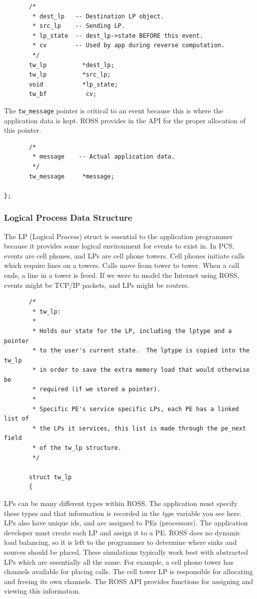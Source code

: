 \documentclass[12pt]{article}
\begin{document}
\begin{verbatim}
       /*
        * dest_lp   -- Destination LP object.
        * src_lp    -- Sending LP.
        * lp_state  -- dest_lp->state BEFORE this event.
        * cv        -- Used by app during reverse computation.
        */
       tw_lp          *dest_lp;
       tw_lp          *src_lp;
       void           *lp_state;
       tw_bf           cv;
\end{verbatim}
 
The {\tt tw\_message} pointer is critical to an event because this is where
the application data is kept.  ROSS provides in the API for the proper
allocation of this pointer.

\begin{verbatim}
       /*
        * message    -- Actual application data.
        */
       tw_message     *message;

};
\end{verbatim}

\subsubsection{Logical Process Data Structure}
The LP (Logical Process) struct is essential to the application
programmer because it provides some logical environment for events to
exist in.  In PCS, events are cell phones, and LPs are cell phone
towers.  Cell phones initiate calls which require lines on a towers.
Calls move from tower to tower.  When a call ends, a line in a tower
is freed.  If we were to model the Internet using ROSS, events might
be TCP/IP packets, and LPs might be routers.

\begin{verbatim}
       /*
        * tw_lp:
        *
        * Holds our state for the LP, including the lptype and a pointer
        * to the user's current state.  The lptype is copied into the tw_lp
        * in order to save the extra memory load that would otherwise be
        * required (if we stored a pointer).
        *
        * Specific PE's service specific LPs, each PE has a linked list of
        * the LPs it services, this list is made through the pe_next field
        * of the tw_lp structure.
        */

       struct tw_lp
       {
\end{verbatim}
 
LPs can be many different types within ROSS.  The application must specify
these types and that information is recorded in the {\em type} variable you
see here.  LPs also have unique ids, and are assigned to PEs (processors).
The application developer must create each LP and assign it to a PE.  ROSS
does no dynamic load balancing, so it is left to the programmer to determine
where sinks and sources should be placed.  These simulations typically work
best with abstracted LPs which are essentially all the same.  For example, a
cell phone tower has channels available for placing calls.  The cell tower LP
is responsible for allocating and freeing its own channels.  The ROSS API
provides functions for assigning and viewing this information.
\end{document}

